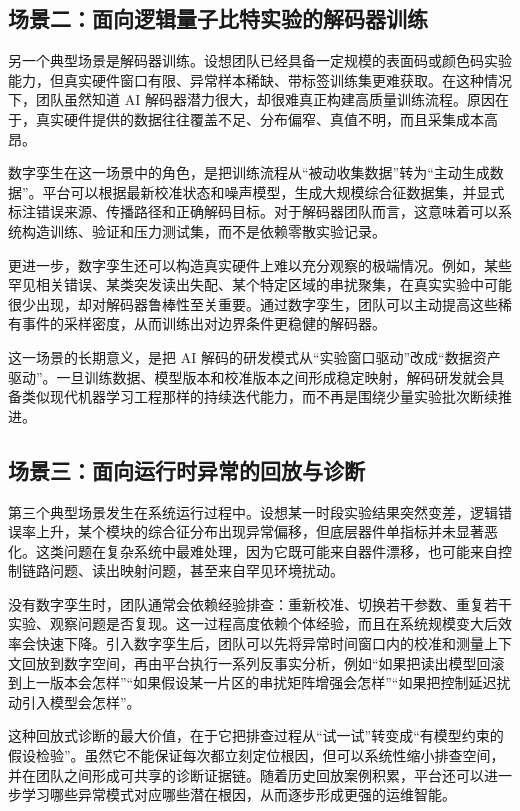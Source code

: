 \documentclass[11pt,a4paper]{article}
\begin{document}
\subsection{场景二：面向逻辑量子比特实验的解码器训练}

另一个典型场景是解码器训练。设想团队已经具备一定规模的表面码或颜色码实验能力，但真实硬件窗口有限、异常样本稀缺、带标签训练集更难获取。在这种情况下，团队虽然知道 AI 解码器潜力很大，却很难真正构建高质量训练流程。原因在于，真实硬件提供的数据往往覆盖不足、分布偏窄、真值不明，而且采集成本高昂。

数字孪生在这一场景中的角色，是把训练流程从“被动收集数据”转为“主动生成数据”。平台可以根据最新校准状态和噪声模型，生成大规模综合征数据集，并显式标注错误来源、传播路径和正确解码目标。对于解码器团队而言，这意味着可以系统构造训练、验证和压力测试集，而不是依赖零散实验记录。

更进一步，数字孪生还可以构造真实硬件上难以充分观察的极端情况。例如，某些罕见相关错误、某类突发读出失配、某个特定区域的串扰聚集，在真实实验中可能很少出现，却对解码器鲁棒性至关重要。通过数字孪生，团队可以主动提高这些稀有事件的采样密度，从而训练出对边界条件更稳健的解码器。

这一场景的长期意义，是把 AI 解码的研发模式从“实验窗口驱动”改成“数据资产驱动”。一旦训练数据、模型版本和校准版本之间形成稳定映射，解码研发就会具备类似现代机器学习工程那样的持续迭代能力，而不再是围绕少量实验批次断续推进。

\subsection{场景三：面向运行时异常的回放与诊断}

第三个典型场景发生在系统运行过程中。设想某一时段实验结果突然变差，逻辑错误率上升，某个模块的综合征分布出现异常偏移，但底层器件单指标并未显著恶化。这类问题在复杂系统中最难处理，因为它既可能来自器件漂移，也可能来自控制链路问题、读出映射问题，甚至来自罕见环境扰动。

没有数字孪生时，团队通常会依赖经验排查：重新校准、切换若干参数、重复若干实验、观察问题是否复现。这一过程高度依赖个体经验，而且在系统规模变大后效率会快速下降。引入数字孪生后，团队可以先将异常时间窗口内的校准和测量上下文回放到数字空间，再由平台执行一系列反事实分析，例如“如果把读出模型回滚到上一版本会怎样”“如果假设某一片区的串扰矩阵增强会怎样”“如果把控制延迟扰动引入模型会怎样”。

这种回放式诊断的最大价值，在于它把排查过程从“试一试”转变成“有模型约束的假设检验”。虽然它不能保证每次都立刻定位根因，但可以系统性缩小排查空间，并在团队之间形成可共享的诊断证据链。随着历史回放案例积累，平台还可以进一步学习哪些异常模式对应哪些潜在根因，从而逐步形成更强的运维智能。
\end{document}
